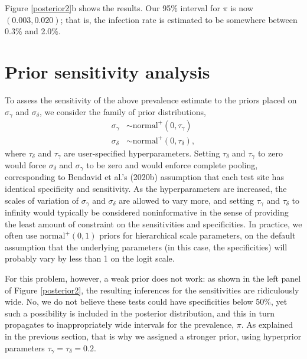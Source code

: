 \documentclass[11pt]{article}
\begin{document}
Figure \ref{posterior2}b shows the results.  Our 95\% interval for $\pi$ is now $(0.003, 0.020)$; that is, the infection rate is estimated to be somewhere between 0.3\% and 2.0\%.

\section{Prior sensitivity analysis}

To assess the sensitivity of the above prevalence estimate to the priors
placed on $\sigma_{\gamma}$ and $\sigma_{\delta}$, we consider the family of prior distributions,
\begin{align*}
  \sigma_{\gamma} & \sim \mbox{normal}^+(0, \tau_{\gamma})\\
\sigma_{\delta} & \sim  \mbox{normal}^+(0, \tau_{\delta}),
\end{align*}
where $\tau_{\delta} $ and $\tau_{\gamma} $ are user-specified
hyperparameters. Setting  $\tau_{\delta}$ and
$\tau_{\gamma}$ to zero would force $\sigma_{\delta}$ and
$\sigma_{\gamma}$ to be zero and would enforce complete pooling,
corresponding to Bendavid et al.'s (2020b) assumption that each test site has identical
specificity  and sensitivity. As the hyperparameters are increased, the
scales of variation of $\sigma_{\gamma}$ and $\sigma_{\delta}$ are
allowed to vary more, and setting $\tau_{\gamma}$ and $\tau_{\delta}$ to infinity would typically be considered noninformative in the sense of providing the least amount of constraint on the sensitivities and specificities.  In practice, we often use $\mbox{normal}^+(0,1)$ priors for hierarchical scale parameters, on the default assumption that the underlying parameters (in this case, the specificities) will probably vary by less than 1 on the logit scale.

For this problem, however, a weak prior does not work:  as shown in the left panel of Figure \ref{posterior2}, the resulting inferences for the sensitivities are ridiculously wide. No, we do not believe these tests could have specificities below 50\%, yet such a possibility is included in the posterior distribution, and this in turn propagates to inappropriately wide intervals for the prevalence, $\pi$.  As explained in the previous section, that is why we assigned a stronger prior, using hyperprior parameters $\tau_{\gamma}=\tau_{\delta}=0.2$.
\end{document}
